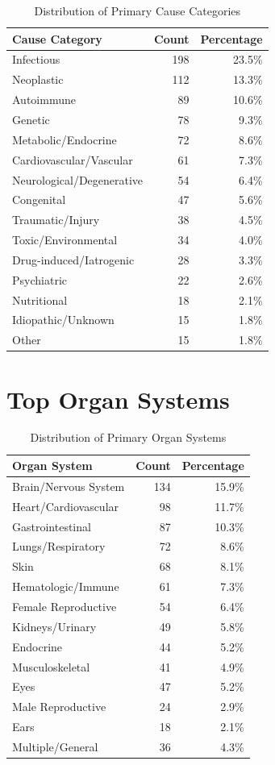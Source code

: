 \begin{table}[htbp]
\centering
\caption{Distribution of Primary Cause Categories}
\label{tab:cause_dist}
\begin{tabular}{lrr}
\toprule
\textbf{Cause Category} & \textbf{Count} & \textbf{Percentage} \\
\midrule
Infectious & 198 & 23.5\% \\
Neoplastic & 112 & 13.3\% \\
Autoimmune & 89 & 10.6\% \\
Genetic & 78 & 9.3\% \\
Metabolic/Endocrine & 72 & 8.6\% \\
Cardiovascular/Vascular & 61 & 7.3\% \\
Neurological/Degenerative & 54 & 6.4\% \\
Congenital & 47 & 5.6\% \\
Traumatic/Injury & 38 & 4.5\% \\
Toxic/Environmental & 34 & 4.0\% \\
Drug-induced/Iatrogenic & 28 & 3.3\% \\
Psychiatric & 22 & 2.6\% \\
Nutritional & 18 & 2.1\% \\
Idiopathic/Unknown & 15 & 1.8\% \\
Other & 15 & 1.8\% \\
\bottomrule
\end{tabular}
\end{table}

\section{Top Organ Systems}
\label{sec:organ_distribution}

\begin{table}[htbp]
\centering
\caption{Distribution of Primary Organ Systems}
\label{tab:organ_dist}
\begin{tabular}{lrr}
\toprule
\textbf{Organ System} & \textbf{Count} & \textbf{Percentage} \\
\midrule
Brain/Nervous System & 134 & 15.9\% \\
Heart/Cardiovascular & 98 & 11.7\% \\
Gastrointestinal & 87 & 10.3\% \\
Lungs/Respiratory & 72 & 8.6\% \\
Skin & 68 & 8.1\% \\
Hematologic/Immune & 61 & 7.3\% \\
Female Reproductive & 54 & 6.4\% \\
Kidneys/Urinary & 49 & 5.8\% \\
Endocrine & 44 & 5.2\% \\
Musculoskeletal & 41 & 4.9\% \\
Eyes & 47 & 5.2\% \\
Male Reproductive & 24 & 2.9\% \\
Ears & 18 & 2.1\% \\
Multiple/General & 36 & 4.3\% \\
\bottomrule
\end{tabular}
\end{table}

